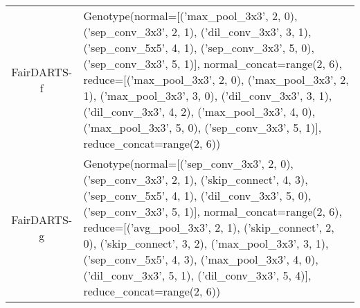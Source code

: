 \documentclass[runningheads]{llncs}
\begin{document}
\begin{table*}
\begin{center}
\begin{footnotesize}
\begin{tabular}{cp{10cm}}
				\\
				FairDARTS-f &  Genotype(normal=[('max\_pool\_3x3', 2, 0), ('sep\_conv\_3x3', 2, 1), ('dil\_conv\_3x3', 3, 1), ('sep\_conv\_5x5', 4, 1), ('sep\_conv\_3x3', 5, 0), ('sep\_conv\_3x3', 5, 1)], normal\_concat=range(2, 6), 
				reduce=[('max\_pool\_3x3', 2, 0), ('max\_pool\_3x3', 2, 1), ('max\_pool\_3x3', 3, 0), ('dil\_conv\_3x3', 3, 1), ('dil\_conv\_3x3', 4, 2), ('max\_pool\_3x3', 4, 0), ('max\_pool\_3x3', 5, 0), ('sep\_conv\_3x3', 5, 1)], reduce\_concat=range(2, 6))
				
				\\
				FairDARTS-g & Genotype(normal=[('sep\_conv\_3x3', 2, 0), ('sep\_conv\_3x3', 2, 1), ('skip\_connect', 4, 3), ('sep\_conv\_5x5', 4, 1), ('dil\_conv\_3x3', 5, 0), ('sep\_conv\_3x3', 5, 1)], normal\_concat=range(2, 6), 
				reduce=[('avg\_pool\_3x3', 2, 1), ('skip\_connect', 2, 0), ('skip\_connect', 3, 2), ('max\_pool\_3x3', 3, 1), ('sep\_conv\_5x5', 4, 3), ('max\_pool\_3x3', 4, 0), ('dil\_conv\_3x3', 5, 1), ('dil\_conv\_3x3', 5, 4)], reduce\_concat=range(2, 6))
				\\ 
				\hline
			\end{tabular}
		\end{footnotesize}
	\end{center}
\end{table*}
\end{document}
